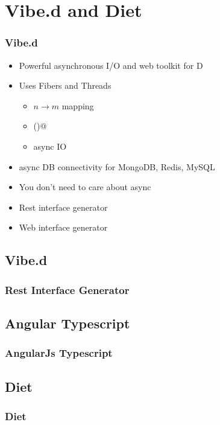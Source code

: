 \documentclass[xelatex,13pt]{beamer}
\begin{document}
\section{Vibe.d and Diet}
\begin{frame}
	\frametitle{Vibe.d}
	\begin{itemize}
		\item Powerful asynchronous I/O and web toolkit for D
		\item Uses Fibers and Threads
			\pause
			\begin{itemize}
				\item \(n \rightarrow m\) mapping
				\item \lstinline@yield()@
				\item async IO
			\end{itemize}
			\pause
		\item async DB connectivity for MongoDB, Redis, MySQL
		\item You don't need to care about async
		\item Rest interface generator
		\item Web interface generator
	\end{itemize}
\end{frame}

\subsection{Vibe.d}
\begin{frame}
	\frametitle{Rest Interface Generator}
	
	\pause
	
	\pause
	
\end{frame}

\subsection{Angular Typescript}
\begin{frame}
	\frametitle{AngularJs Typescript}
	
\end{frame}

\subsection{Diet}
\begin{frame}
	\frametitle{Diet}
	
	\pause
	
	\pause
	
\end{frame}
\end{document}
